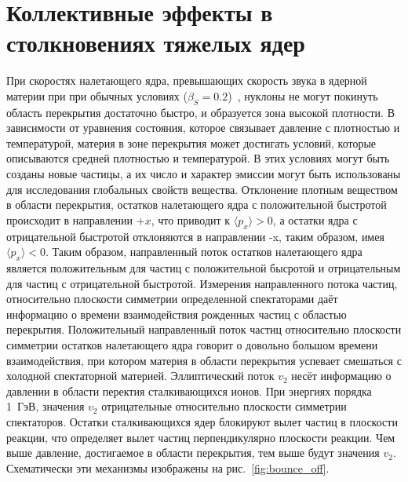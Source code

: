 \section{Коллективные эффекты в столкновениях тяжелых ядер}

При скоростях налетающего ядра, превышающих скорость звука в ядерной материи при при обычных условиях ($\beta_S=0.2$)~\cite{Weber:1998aa}, нуклоны не могут покинуть область перекрытия достаточно быстро, и образуется зона высокой плотности.
В зависимости от уравнения состояния, которое связывает давление с плотностью и температурой, материя в зоне перекрытия может достигать условий, которые описываются средней плотностью и температурой.
В этих условиях могут быть созданы новые частицы, а их число и характер эмиссии могут быть использованы для исследования глобальных свойств вещества.
Отклонение плотным веществом в области перекрытия, остатков налетающего ядра с положительной быстротой происходит в направлении $+x$, что приводит к $\langle p_x \rangle  > 0$, а остатки ядра с отрицательной быстротой отклоняются в направлении -x, таким образом, имея $\langle p_x \rangle < 0$.
Таким образом, направленный поток остатков налетающего ядра является положительным для частиц с положительной бысротой и отрицательным для частиц с отрицательной быстротой.
Измерения направленного потока частиц, относительно плоскости симметрии определенной спектаторами даёт информацию о времени взаимодействия рожденных частиц с областью перекрытия.
Положительный направленный поток частиц относительно плоскости симметрии остатков налетающего ядра говорит о довольно большом времени взаимодействия, при котором материя в области перекрытия успевает смешаться с холодной спектаторной материей.
Эллиптический поток $v_2$ несёт информацию о давлении в области перектия сталкивающихся ионов.
При энергиях порядка 1~ГэВ, значения $v_2$ отрицательные относительно плоскости симметрии спектаторов.
Остатки сталкивающихся ядер блокируют вылет частиц в плоскости реакции, что определяет вылет частиц перпендикулярно плоскости реакции.
Чем выше давление, достигаемое в области перекрытия, тем выше будут значения $v_2$.
Схематически эти механизмы изображены на рис.~\ref{fig:bounce_off}.
%
